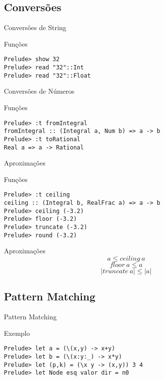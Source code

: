 \documentclass{beamer}
\begin{document}
		\subsection{Conversões}

			\begin{frame}[fragile]{Conversões de String}
			 \begin{block}{Funções}
			  \begin{lstlisting}
Prelude> show 32
Prelude> read "32"::Int
Prelude> read "32"::Float
			  \end{lstlisting}
			 \end{block}
			\end{frame}
			
			\begin{frame}[fragile]{Conversões de Números}
			 \begin{block}{Funções}
				\begin{lstlisting}
Prelude> :t fromIntegral
fromIntegral :: (Integral a, Num b) => a -> b
Prelude> :t toRational
Real a => a -> Rational
				\end{lstlisting}
			 \end{block}				
			\end{frame}
			
			\begin{frame}[fragile]{Aproximações}
			 \begin{block}{Funções}
			  \begin{lstlisting}
Prelude> :t ceiling
ceiling :: (Integral b, RealFrac a) => a -> b
Prelude> ceiling (-3.2)
Prelude> floor (-3.2)
Prelude> truncate (-3.2)
Prelude> round (-3.2)
			  \end{lstlisting}
			 \end{block}
			\end{frame}
			
			\begin{frame}{Aproximações}
			 \[ a \leq ceiling~ a\]
			 \[ floor~ a \leq a\]
			 \[ \left|truncate~ a\right| \leq \left|a\right|\]
			\end{frame}
		
		\subsection{Pattern Matching}
	
		\begin{frame}[fragile]{Pattern Matching}	 
		 \begin{block}{Exemplo}
		  \begin{lstlisting}
Prelude> let a = (\(x,y) -> x+y)
Prelude> let b = (\(x:y:_) -> x*y)
Prelude> let (p,k) = (\x y -> (x,y)) 3 4
Prelude> let Node esq valor dir = n0
		  \end{lstlisting}
		 \end{block}
		\end{frame}
	
\end{document}
